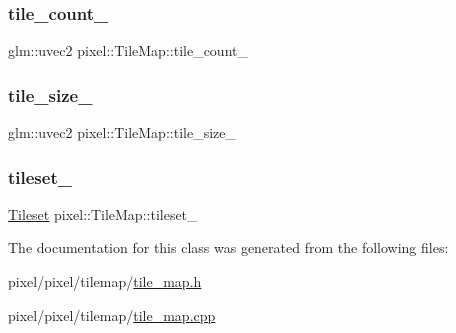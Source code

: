 \subsubsection{\texorpdfstring{tile\+\_\+count\+\_\+}{tile\_count\_}}
{\footnotesize\ttfamily glm\+::uvec2 pixel\+::\+Tile\+Map\+::tile\+\_\+count\+\_\+\hspace{0.3cm}{\ttfamily [private]}}

\mbox{\label{classpixel_1_1_tile_map_a3a21dfe07a89fdba673af740e8da46dd}} 
\subsubsection{\texorpdfstring{tile\+\_\+size\+\_\+}{tile\_size\_}}
{\footnotesize\ttfamily glm\+::uvec2 pixel\+::\+Tile\+Map\+::tile\+\_\+size\+\_\+\hspace{0.3cm}{\ttfamily [private]}}

\mbox{\label{classpixel_1_1_tile_map_a03c3fb17814bbbf8dc344870499e7b76}} 
\subsubsection{\texorpdfstring{tileset\+\_\+}{tileset\_}}
{\footnotesize\ttfamily \hyperlink{classpixel_1_1_tileset}{Tileset} pixel\+::\+Tile\+Map\+::tileset\+\_\+\hspace{0.3cm}{\ttfamily [private]}}



The documentation for this class was generated from the following files\+:\begin{DoxyCompactItemize}
\item 
pixel/pixel/tilemap/\hyperlink{tile__map_8h}{tile\+\_\+map.\+h}\item 
pixel/pixel/tilemap/\hyperlink{tile__map_8cpp}{tile\+\_\+map.\+cpp}\end{DoxyCompactItemize}
